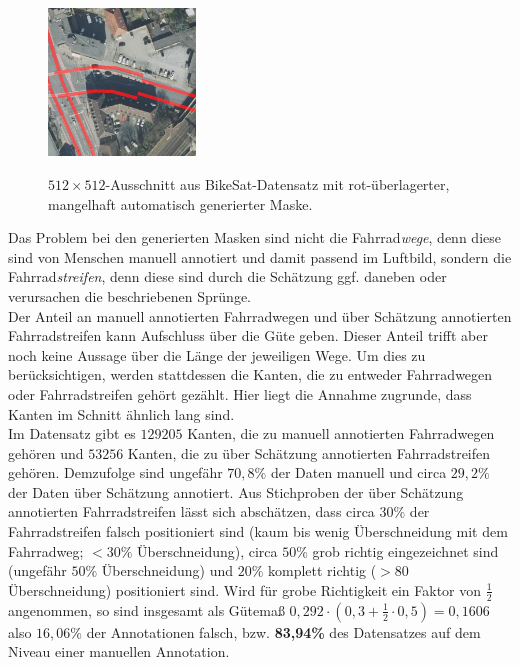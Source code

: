 \begin{figure}
	\centering
	\vspace{-30pt} %
	\includegraphics[width=0.35\textwidth]{Bilder/bad-mask-example.png}
	\vspace{-10pt}
	\caption[Schlechte Maske eines $512{\times}512$-Ausschnittes aus BikeSat-Datensatz.]{\unskip}
	$512{\times}512$-Ausschnitt aus BikeSat-Datensatz mit rot-überlagerter, mangelhaft automatisch generierter Maske.
	\label{fig:bad-mask}
\end{figure}

Das Problem bei den generierten Masken sind nicht die Fahrrad\textit{wege}, denn diese sind von Menschen manuell annotiert und damit passend im Luftbild, 
sondern die Fahrrad\textit{streifen}, denn diese sind durch die Schätzung ggf. daneben oder verursachen die beschriebenen Sprünge. \\
Der Anteil an manuell annotierten Fahrradwegen und über Schätzung annotierten Fahrradstreifen kann Aufschluss über die Güte geben. 
Dieser Anteil trifft aber noch keine Aussage über die Länge der jeweiligen Wege. Um dies zu berücksichtigen, werden stattdessen die Kanten, die zu 
entweder Fahrradwegen oder Fahrradstreifen gehört gezählt. Hier liegt die Annahme zugrunde, dass Kanten im Schnitt ähnlich lang sind.\\
Im Datensatz gibt es $129205$ Kanten, die zu manuell annotierten Fahrradwegen gehören und $53256$ Kanten, die zu über Schätzung annotierten Fahrradstreifen gehören. 
Demzufolge sind ungefähr $70,8\%$ der Daten manuell und circa $29,2\%$ der Daten über Schätzung annotiert. 
Aus Stichproben der über Schätzung annotierten Fahrradstreifen lässt sich abschätzen, dass circa $30\%$ der Fahrradstreifen falsch 
positioniert sind 
(kaum bis wenig Überschneidung mit dem Fahrradweg; $<30\%$ Überschneidung), circa $50\%$ grob richtig eingezeichnet sind (ungefähr $50\%$ Überschneidung)
und $20\%$ komplett richtig ($>80$ Überschneidung) positioniert sind. Wird für grobe Richtigkeit ein Faktor von $\frac{1}{2}$ angenommen, so sind insgesamt
als Gütemaß $0,292 \cdot (0,3 + \frac{1}{2} \cdot 0,5) = 0,1606$ also $16,06\%$ der Annotationen falsch, bzw. 
\textbf{83,94\%} des Datensatzes auf dem Niveau einer manuellen Annotation. 

